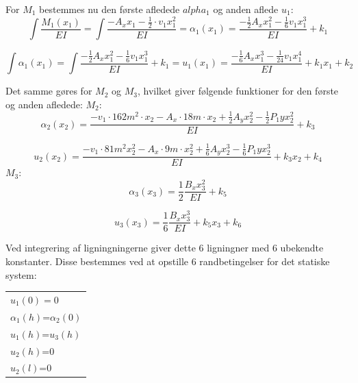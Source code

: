For $M_1$ bestemmes nu den første afledede $alpha_1$ og anden aflede $u_1$: %
\begin{equation}
	\int \frac{M_1(x_1)}{EI} = \int \frac{-A_x x_1 - \frac{1}{2}\cdot v_1 x_1^2}{EI}
	= \alpha_1(x_1) = \frac{-\frac{1}{2} A_x x_1^2 - \frac{1}{6}  v_1  x_1^3 }{EI} + k_1
\end{equation}

\begin{equation}
	\int \alpha_1(x_1) = \int \frac{-\frac{1}{2} A_x x_1^2 - \frac{1}{6} v_1 x_1^3}{EI} + k_1
	= u_1(x_1) = \frac{-\frac{1}{6} A_x x_1^3 - \frac{1}{24} v_1x_1^4 }{EI} + k_1 x_1 + k_2
\end{equation}

Det samme gøres for $M_2$ og $M_3$, hvilket giver følgende funktioner for den første og anden afledede: 
\newline
\newline
$M_2$:
\begin{equation}
	\alpha_2(x_2) = \frac{-v_1 \cdot 162m^2 \cdot x_2 - A_x \cdot 18m \cdot x_2 + \frac{1}{2} A_y x_2^2 - \frac{1}{2}P_1y x_2^2}{EI} + k_3
\end{equation}
	
\begin{equation}
	u_2(x_2) = \frac{-v_1 \cdot 81m^2 x_2^2 - A_x \cdot 9m \cdot x_2^2 + \frac{1}{6} A_y x_2^3 - \frac{1}{6} P_1y x_2^3}{EI} + k_3 x_2 + k_4
\end{equation} 
\newline
\newline
$M_3$:
\begin{equation}
\alpha_3(x_3) = \frac{1}{2}\frac{B_x x_3^2}{EI} + k_5
\end{equation}

\begin{equation}
u_3(x_3) = \frac{1}{6} \frac{B_x x_3^3}{EI} + k_5 x_3 + k_6
\end{equation}

Ved integrering af ligningningerne giver dette 6 ligningner med 6 ubekendte konstanter. Disse bestemmes ved at opstille 6 randbetingelser for det statiske system: 

\begin{table}[h]
	\begin{tabular}{l}
		$u_1(0)=0$       \\
		$\alpha_1(h)$=$\alpha_2(0)$ \\
		$u_1(h)$=$u_3(h)$ \\
		$u_2(h)$=0       \\
		$u_2(l)$=0       \\
	\end{tabular}
\end{table}

